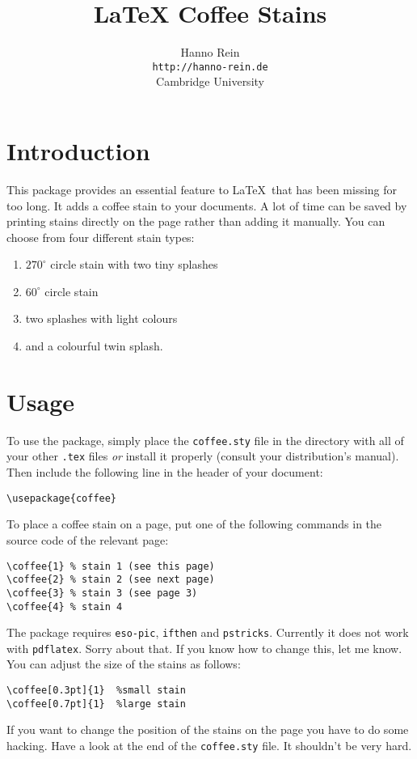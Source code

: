 \documentclass{article}
\begin{document}
\title{LaTeX Coffee Stains}
\author{Hanno Rein\\
\texttt{http://hanno-rein.de}\\
Cambridge University}
\renewcommand{\today}{April 3, 2009}
\maketitle
{}
\section{Introduction}
This package provides an essential feature to \LaTeX~that has been missing for too long. It adds a coffee stain to your documents. A lot of time can be saved by printing stains directly on the page rather than adding it manually. You can choose from four different stain types:
\begin{enumerate}
  \item $270^\circ$ circle stain with two tiny splashes 
  \item $60^\circ$ circle stain 
  \item two splashes with light colours
  \item and a colourful twin splash.
\end{enumerate}

\section{Usage}
To use the package, simply place the \texttt{coffee.sty} file in the directory with all of your other \texttt{.tex} files \textit{or} install it properly (consult your distribution's manual). Then include the following line in the header of your document:
\begin{verbatim}
\usepackage{coffee}
\end{verbatim}
To place a coffee stain on a page, put one of the following commands in the source code of the relevant page: 
\begin{verbatim}
\coffee{1} % stain 1 (see this page)
\coffee{2} % stain 2 (see next page)
\coffee{3} % stain 3 (see page 3)
\coffee{4} % stain 4
\end{verbatim}
The package requires \texttt{eso-pic}, \texttt{ifthen} and \texttt{pstricks}. Currently it does not work with \texttt{pdflatex}. Sorry about that. If you know how to change this, let me know.  
\newpage
\noindent You can adjust the size of the stains as follows:
\begin{verbatim}
\coffee[0.3pt]{1}  %small stain
\coffee[0.7pt]{1}  %large stain
\end{verbatim}
If you want to change the position of the stains on the page you have to do some hacking. Have a look at the end of the \texttt{coffee.sty} file. It shouldn't be very hard. 
\end{document}
